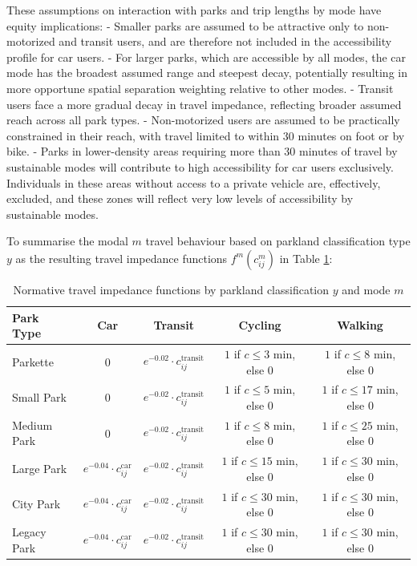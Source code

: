 \documentclass[
11pt, %
oneside, %
english, %
singlespacing, %
]{macthesis} %
\begin{document}
These assumptions on interaction with parks and trip lengths by mode have equity implications:
- Smaller parks are assumed to be attractive only to non-motorized and transit users, and are therefore not included in the accessibility profile for car users.
- For larger parks, which are accessible by all modes, the car mode has the broadest assumed range and steepest decay, potentially resulting in more opportune spatial separation weighting relative to other modes.
- Transit users face a more gradual decay in travel impedance, reflecting broader assumed reach across all park types.
- Non-motorized users are assumed to be practically constrained in their reach, with travel limited to within 30 minutes on foot or by bike.
- Parks in lower-density areas requiring more than 30 minutes of travel by sustainable modes will contribute to high accessibility for car users exclusively. Individuals in these areas without access to a private vehicle are, effectively, excluded, and these zones will reflect very low levels of accessibility by sustainable modes.

To summarise the modal \(m\) travel behaviour based on parkland classification type \(y\) as the resulting travel impedance functions \(f^m(c^m_{ij})\) in Table \ref{tab:chp3-travel-impedance-by-park-mode}:

\begin{table}[ht]
\centering
\small
\begin{tabular}{|l|c|c|c|c|}
\hline
\textbf{Park Type} & \textbf{Car} & \textbf{Transit} & \textbf{Cycling} & \textbf{Walking} \\
\hline
Parkette &
0 &
$e^{-0.02} \cdot c_{ij}^{\text{transit}}$ &
$1$ if $c \leq 3$ min, else 0 &
$1$ if $c \leq 8$ min, else 0 \\
\hline
Small Park &
0 &
$e^{-0.02} \cdot c_{ij}^{\text{transit}}$ &
$1$ if $c \leq 5$ min, else 0 &
$1$ if $c \leq 17$ min, else 0 \\
\hline
Medium Park &
0 &
$e^{-0.02} \cdot c_{ij}^{\text{transit}}$ &
$1$ if $c \leq 8$ min, else 0 &
$1$ if $c \leq 25$ min, else 0 \\
\hline
Large Park &
$e^{-0.04} \cdot c_{ij}^{\text{car}}$ &
$e^{-0.02} \cdot c_{ij}^{\text{transit}}$ &
$1$ if $c \leq 15$ min, else 0 &
$1$ if $c \leq 30$ min, else 0 \\
\hline
City Park &
$e^{-0.04} \cdot c_{ij}^{\text{car}}$ &
$e^{-0.02} \cdot c_{ij}^{\text{transit}}$ &
$1$ if $c \leq 30$ min, else 0 &
$1$ if $c \leq 30$ min, else 0 \\
\hline
Legacy Park &
$e^{-0.04} \cdot c_{ij}^{\text{car}}$ &
$e^{-0.02} \cdot c_{ij}^{\text{transit}}$ &
$1$ if $c \leq 30$ min, else 0 &
$1$ if $c \leq 30$ min, else 0 \\
\hline
\end{tabular}
\caption{Normative travel impedance functions by parkland classification $y$ and mode $m$}
\label{tab:chp3-travel-impedance-by-park-mode}
\end{table}
\end{document}
